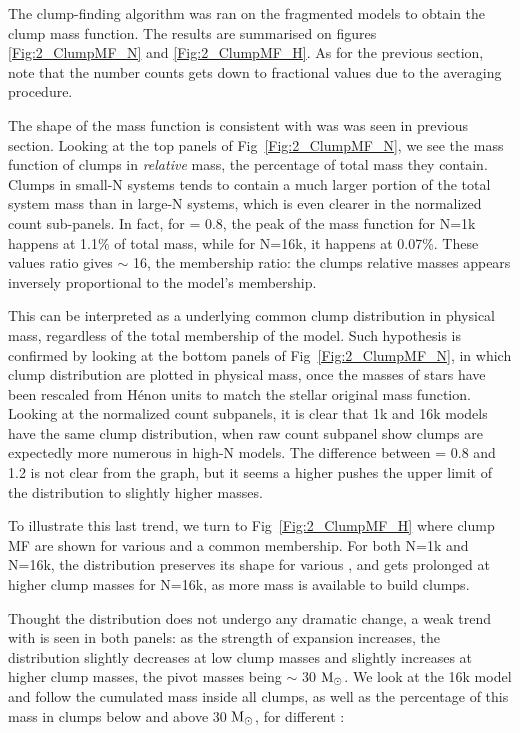  The clump-finding algorithm was ran on the fragmented models to obtain the clump mass function. The results are summarised on figures \ref{Fig:2_ClumpMF_N} and \ref{Fig:2_ClumpMF_H}. As for the previous section, note that the number counts gets down to fractional values due to the averaging procedure. 

 The shape of the mass function is consistent with was was seen in previous section. Looking at the top panels of Fig~\ref{Fig:2_ClumpMF_N}, we see the mass function of clumps in \textit{relative} mass, the percentage of total mass they contain.  Clumps in small-N systems tends to contain a much larger portion of the total system mass than in large-N systems, which is even clearer in the normalized count sub-panels. In fact, for \tHub = 0.8, the peak of the mass function for N=1k happens at 1.1\% of total mass, while for N=16k, it happens at 0.07\%. These values ratio gives $\sim$ 16, the membership ratio: the clumps relative masses appears inversely proportional to the model's membership.
 
This can be interpreted as a underlying common clump distribution in physical mass, regardless of the total membership of the model. Such hypothesis is confirmed by looking at the bottom panels of Fig~\ref{Fig:2_ClumpMF_N}, in which clump distribution are plotted in physical mass, once the masses of stars have been rescaled from H\'enon units to match the stellar original mass function. Looking at the normalized count subpanels, it is clear that 1k and 16k models have the same clump distribution, when raw count subpanel show clumps are expectedly more numerous in high-N models. The difference between \tHub = 0.8 and 1.2 is not clear from the graph, but it seems a higher \tHub pushes the upper limit of the distribution to slightly higher masses.

To illustrate this last trend, we turn to Fig~\ref{Fig:2_ClumpMF_H} where clump MF are shown for various \tHub and a common membership. For  both N=1k and N=16k, the distribution preserves its shape for various \tHub, and gets prolonged at higher clump masses for N=16k, as more mass is available to build clumps.

 Thought the distribution does not undergo any dramatic change, a weak trend with \tHub is seen in both panels: as the strength of expansion increases, the distribution slightly decreases at low clump masses and slightly increases at higher clump masses, the pivot masses being $\sim$ 30 ${\textrm{M}_\odot}$. We look at the 16k model and follow the cumulated mass inside all clumps, as well as the percentage of this mass in clumps below and above 30 ${\textrm{M}_\odot}$, for different \tHub:


